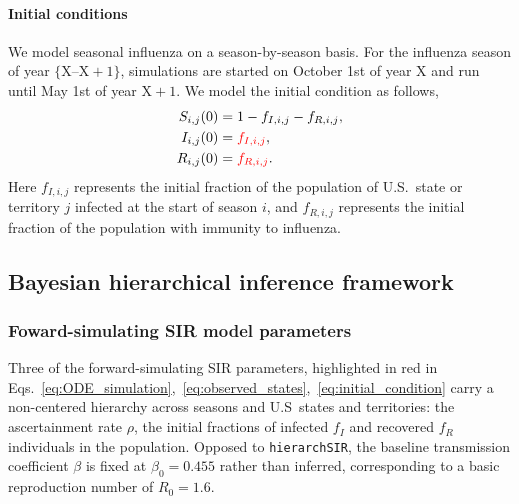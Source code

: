 \documentclass[11pt]{article}
\begin{document}
\paragraph{Initial conditions} We model seasonal influenza on a season-by-season basis. For the influenza season of year $\{\text{X} \text{--} \text{X}+1\}$, simulations are started on October 1st of year $\text{X}$ and run until May 1st of year $\text{X}+1$. We model the initial condition as follows,
\begin{align}\label{eq:initial_condition}
    S_{i,j}(0) &= 1- f_{I,i,j}-f_{R,i,j}, \nonumber \\
    I_{i,j}(0) &= \textcolor{red}{f_{I,i,j}}, \nonumber \\
    R_{i,j}(0) &= \textcolor{red}{f_{R,i,j}}. 
\end{align}
Here $f_{I,i,j}$ represents the initial fraction of the population of U.S.\ state or territory $j$ infected at the start of season $i$, and $f_{R,i,j}$ represents the initial fraction of the population with immunity to influenza.

\subsection*{Bayesian hierarchical inference framework}

\subsubsection*{Foward-simulating SIR model parameters}
Three of the forward-simulating SIR parameters, highlighted in red in Eqs.~\eqref{eq:ODE_simulation},~\eqref{eq:observed_states},~\eqref{eq:initial_condition} carry a non-centered hierarchy across seasons and U.S\ states and territories: the ascertainment rate $\rho$, the initial fractions of infected $f_I$ and recovered $f_R$ individuals in the population. Opposed to \texttt{hierarchSIR}, the baseline transmission coefficient $\beta$ is fixed at $\beta_0 = 0.455$ rather than inferred, corresponding to a basic reproduction number of $R_0 = 1.6$.\\
\end{document}
